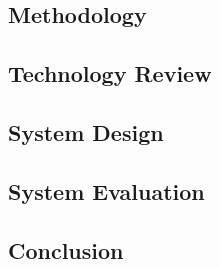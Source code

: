 \subsection{Methodology}
\subsection{Technology Review}
\subsection{System Design}
\subsection{System Evaluation}
\subsection{Conclusion}